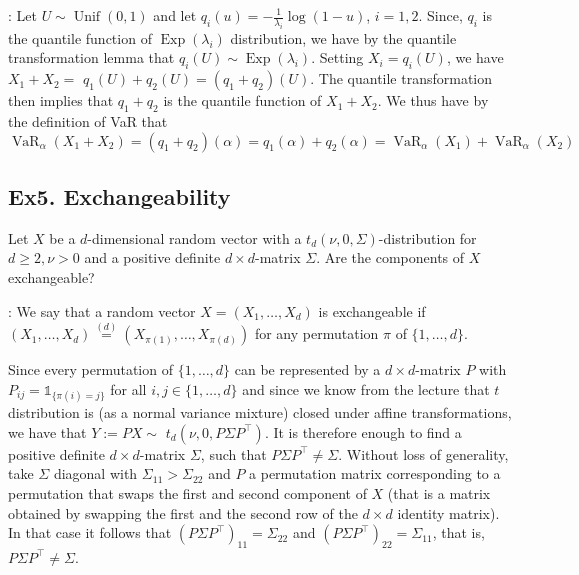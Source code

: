: Let $U \sim \operatorname{Unif}(0,1)$ and let $q_{i}(u)=-\frac{1}{\lambda_{i}} \log (1-u)$, $i=1,2$. Since, $q_{i}$ is the quantile function of $\operatorname{Exp}\left(\lambda_{i}\right)$ distribution, we have by the quantile transformation lemma that $q_{i}(U) \sim \operatorname{Exp}\left(\lambda_{i}\right)$. Setting $X_{i}=q_{i}(U)$, we have $X_{1}+X_{2}=$ $q_{1}(U)+q_{2}(U)=\left(q_{1}+q_{2}\right)(U)$. The quantile transformation then implies that $q_{1}+q_{2}$ is the quantile function of $X_{1}+X_{2}$. We thus have by the definition of VaR that
$
\operatorname{VaR}_{\alpha}\left(X_{1}+X_{2}\right)=\left(q_{1}+q_{2}\right)(\alpha)=q_{1}(\alpha)+q_{2}(\alpha)=\operatorname{VaR}_{\alpha}\left(X_{1}\right)+\operatorname{VaR}_{\alpha}\left(X_{2}\right)
$





\subsection*{Ex5. Exchangeability}
Let $X$ be a $d$-dimensional random vector with a $t_{d}(\nu, 0, \Sigma)$-distribution for $d \geq 2, \nu>0$ and a positive definite $d \times d$-matrix $\Sigma$. Are the components of $X$ exchangeable?

: We say that a random vector $X=\left(X_{1}, \ldots, X_{d}\right)$ is exchangeable if
$
\left(X_{1}, \ldots, X_{d}\right) \stackrel{(d)}{=}\left(X_{\pi(1)}, \ldots, X_{\pi(d)}\right)
$
for any permutation $\pi$ of $\{1, \ldots, d\}$. 

Since every permutation of $\{1, \ldots, d\}$ can be represented by a $d \times d$-matrix $P$ with
$
P_{i j}=\mathbb{1}_{\{\pi(i)=j\}}
$
for all $i, j \in\{1, \ldots, d\}$ and since we know from the lecture that $t$ distribution is (as a normal variance mixture) closed under affine transformations, we have that $Y:=P X \sim$ $t_{d}\left(\nu, 0, P \Sigma P^{\top}\right)$. It is therefore enough to find a positive definite $d \times d$-matrix $\Sigma$, such that $P \Sigma P^{\top} \neq \Sigma$. Without loss of generality, take $\Sigma$ diagonal with $\Sigma_{11}>\Sigma_{22}$ and $P$ a permutation matrix corresponding to a permutation that swaps the first and second component of $X$ (that is a matrix obtained by swapping the first and the second row of the $d \times d$ identity matrix). In that case it follows that $\left(P \Sigma P^{\top}\right)_{11}=\Sigma_{22}$ and $\left(P \Sigma P^{\top}\right)_{22}=\Sigma_{11}$, that is, $P \Sigma P^{\top} \neq \Sigma$.



